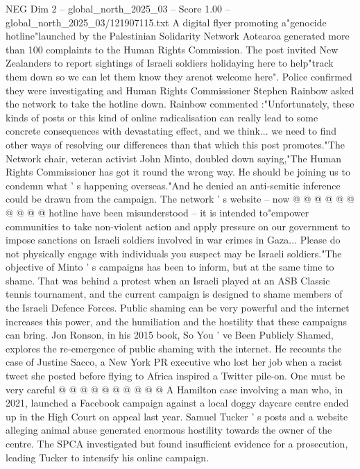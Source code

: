 \begin{textsample}{NEG Dim 2 – global\_north\_2025\_03 – Score 1.00 – global\_north\_2025\_03/121907115.txt}  \label{ex:f2_neg_046}
A digital flyer promoting a"genocide hotline"launched by the Palestinian Solidarity Network Aotearoa generated more than 100 complaints to the Human Rights Commission.
The post invited New Zealanders to report sightings of Israeli soldiers holidaying here to help"track them down so we can let them know they arenot welcome here".
Police confirmed they were investigating and Human Rights Commissioner Stephen Rainbow asked the network to take the hotline down.
Rainbow commented :"Unfortunately, these kinds of posts or this kind of online radicalisation can really lead to some concrete consequences with devastating effect, and we think... we need to find other ways of resolving our differences than that which this post promotes."The Network chair, veteran activist John Minto, doubled down saying,"The Human Rights Commissioner has got it round the wrong way.
He should be joining us to condemn what ' s happening overseas."And he denied an anti-semitic inference could be drawn from the campaign.
The network ' s website -- now @ @ @ @ @ @ @ @ @ @ hotline have been misunderstood -- it is intended to"empower communities to take non-violent action and apply pressure on our government to impose sanctions on Israeli soldiers involved in war crimes in Gaza...
Please do not physically engage with individuals you suspect may be Israeli soldiers."The objective of Minto ' s campaigns has been to inform, but at the same time to shame.
That was behind a protest when an Israeli played at an ASB Classic tennis tournament, and the current campaign is designed to shame members of the Israeli Defence Forces.
Public shaming can be very powerful and the internet increases this power, and the humiliation and the hostility that these campaigns can bring.
Jon Ronson, in his 2015 book, So You ' ve Been Publicly Shamed, explores the re-emergence of public shaming with the internet.
He recounts the case of Justine Sacco, a New York PR executive who lost her job when a racist tweet she posted before flying to Africa inspired a Twitter pile-on.
One must be very careful @ @ @ @ @ @ @ @ @ @ A Hamilton case involving a man who, in 2021, launched a Facebook campaign against a local doggy daycare centre ended up in the High Court on appeal last year.
Samuel Tucker ' s posts and a website alleging animal abuse generated enormous hostility towards the owner of the centre.
The SPCA investigated but found insufficient evidence for a prosecution, leading Tucker to intensify his online campaign.

\end{textsample}
